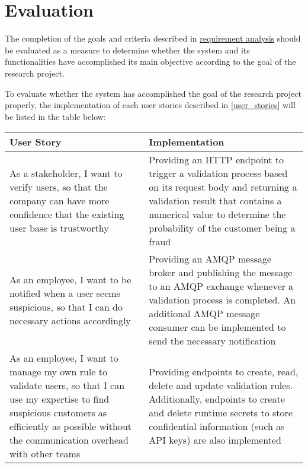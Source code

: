 \section{Evaluation}

  The completion of the goals and criteria described in \hyperref[analysis]{requirement analysis} should be evaluated as a measure to determine whether the system and its functionalities have accomplished its main objective according to the goal of the research project. 

  To evaluate whether the system has accomplished the goal of the research project properly, the implementation of each user stories described in \autoref{user_stories} will be listed in the table below: 
  
  \begin{tabularx}{\linewidth}{p{} p{}}
   \caption{Implementations of the primary use cases of the system} \\
    \toprule
    User Story & Implementation \\
    \midrule
    As a stakeholder, I want to verify users, so that the company can have more confidence that the existing user base is trustworthy & Providing an HTTP endpoint to trigger a validation process based on its request body and returning a validation result that contains a numerical value to determine the probability of the customer being a fraud \\

    \hline

    As an employee, I want to be notified when a user seems suspicious, so that I can do necessary actions accordingly & Providing an AMQP message broker and publishing the message to an AMQP exchange whenever a validation process is completed. An additional AMQP message consumer can be implemented to send the necessary notification \\

    \hline 

    As an employee, I want to manage my own rule to validate users, so that I can use my expertise to find suspicious customers as efficiently as possible without the communication overhead with other teams & Providing endpoints to create, read, delete and update validation rules. Additionally, endpoints to create and delete runtime secrets to store confidential information (such as API keys) are also implemented \\
    \bottomrule
  \end{tabularx}


